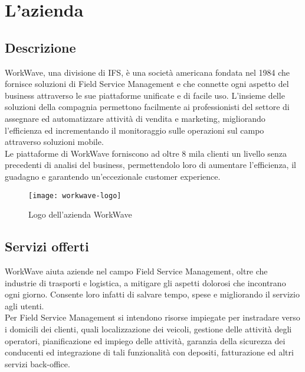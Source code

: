 
\chapter{L'azienda}
\label{cap:azienda}

\section{Descrizione}

WorkWave, una divisione di IFS, è una società americana fondata nel 1984 che fornisce soluzioni di Field Service Management e che connette ogni aspetto del business attraverso le sue piattaforme unificate e di facile uso. L'insieme delle soluzioni della compagnia permettono facilmente ai professionisti del settore di assegnare ed automatizzare attività di vendita e marketing, migliorando l'efficienza ed incrementando il monitoraggio sulle operazioni sul campo attraverso soluzioni mobile. \\

Le piattaforme di WorkWave forniscono ad oltre 8 mila clienti un livello senza precedenti di analisi del business, permettendolo loro di aumentare l'efficienza, il guadagno e garantendo un'eccezionale customer experience.

\begin{figure}[H] 
  \centering 
  \texttt{[image: workwave-logo]} 
  \caption{Logo dell'azienda WorkWave}
\end{figure}

\section{Servizi offerti}

WorkWave aiuta aziende nel campo Field Service Management, oltre che industrie di trasporti e logistica, a mitigare gli aspetti dolorosi che incontrano ogni giorno. Consente loro infatti di salvare tempo, spese e migliorando il servizio agli utenti. \\

Per Field Service Management si intendono risorse impiegate per instradare verso i domicili dei clienti, quali localizzazione dei veicoli, gestione delle attività degli operatori, pianificazione ed impiego delle attività, garanzia della sicurezza dei conducenti ed integrazione di tali funzionalità con depositi, fatturazione ed altri servizi back-office. \\

